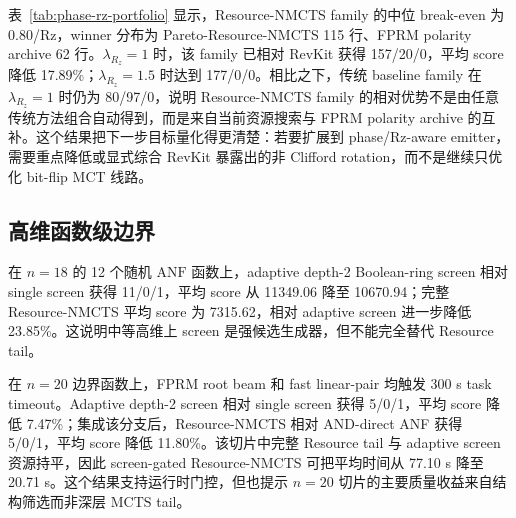 \documentclass[UTF8,fontset=macnew,11pt]{ctexart}
\newcommand{\method}{Resource-NMCTS}
\newcommand{\screen}{Boolean-ring screen}
\newcommand{\anf}{\ensuremath{\mathrm{ANF}}}
\newcommand{\mcts}{\ensuremath{\mathrm{MCTS}}}
\begin{document}
表~\ref{tab:phase-rz-portfolio} 显示，Resource-NMCTS family 的中位 break-even 为 0.80/Rz，winner 分布为 Pareto-\method{} 115 行、FPRM polarity archive 62 行。$\lambda_{R_z}=1$ 时，该 family 已相对 RevKit 获得 157/20/0，平均 score 降低 17.89\%；$\lambda_{R_z}=1.5$ 时达到 177/0/0。相比之下，传统 baseline family 在 $\lambda_{R_z}=1$ 时仍为 80/97/0，说明 Resource-NMCTS family 的相对优势不是由任意传统方法组合自动得到，而是来自当前资源搜索与 FPRM polarity archive 的互补。这个结果把下一步目标量化得更清楚：若要扩展到 phase/Rz-aware emitter，需要重点降低或显式综合 RevKit 暴露出的非 Clifford rotation，而不是继续只优化 bit-flip MCT 线路。

\begin{table}[H]
\centering
\scriptsize
\caption{Phase/Rz 成本敏感性下的 score-reranked portfolio。$\lambda_{R_z}$ 表示每个 RevKit 非 Clifford $R_z$ 额外计入的 score 单位；Covered 为 break-even threshold 不超过当前 $\lambda_{R_z}$ 的函数数。}
\label{tab:phase-rz-portfolio}

\end{table}

\subsection{高维函数级边界}

在 $n=18$ 的 12 个随机 \anf{} 函数上，adaptive depth-2 \screen{} 相对 single screen 获得 11/0/1，平均 score 从 11349.06 降至 10670.94；完整 \method{} 平均 score 为 7315.62，相对 adaptive screen 进一步降低 23.85\%。这说明中等高维上 screen 是强候选生成器，但不能完全替代 Resource tail。

在 $n=20$ 边界函数上，FPRM root beam 和 fast linear-pair 均触发 300 s task timeout。Adaptive depth-2 screen 相对 single screen 获得 5/0/1，平均 score 降低 7.47\%；集成该分支后，\method{} 相对 AND-direct ANF 获得 5/0/1，平均 score 降低 11.80\%。该切片中完整 Resource tail 与 adaptive screen 资源持平，因此 screen-gated \method{} 可把平均时间从 77.10 s 降至 20.71 s。这个结果支持运行时门控，但也提示 $n=20$ 切片的主要质量收益来自结构筛选而非深层 \mcts{} tail。
\end{document}
